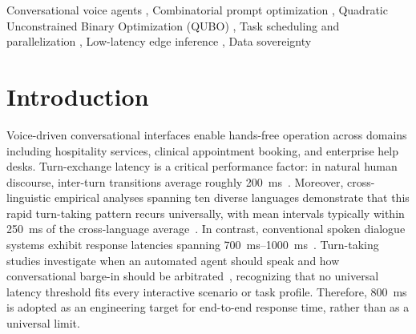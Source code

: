 \documentclass[review,12pt,times,authoryear]{elsarticle}
\theoremstyle{definition}
\begin{document}
\begin{frontmatter}
\begin{keyword}
Conversational voice agents \sep
Combinatorial prompt optimization \sep
Quadratic Unconstrained Binary Optimization (QUBO) \sep
Task scheduling and parallelization \sep
Low-latency edge inference \sep
Data sovereignty
\end{keyword}

\end{frontmatter}

\section{Introduction}
\label{sec:introduction}

Voice-driven conversational interfaces enable hands-free operation across domains including hospitality services, clinical appointment booking, and enterprise help desks. Turn-exchange latency is a critical performance factor: in natural human discourse, inter-turn transitions average roughly \SI{200}{\milli\second}~\citep{Levinson2015}. Moreover, cross-linguistic empirical analyses spanning ten diverse languages demonstrate that this rapid turn-taking pattern recurs universally, with mean intervals typically within \SI{250}{\milli\second} of the cross-language average~\citep{Stivers2009}. In contrast, conventional spoken dialogue systems exhibit response latencies spanning \SIrange{700}{1000}{\milli\second}~\citep{Castillo2025}. Turn-taking studies investigate when an automated agent should speak and how conversational barge-in should be arbitrated~\citep{Skantze2021}, recognizing that no universal latency threshold fits every interactive scenario or task profile. Therefore, \SI{800}{\milli\second} is adopted as an engineering target for end-to-end response time, rather than as a universal limit.
\end{document}
